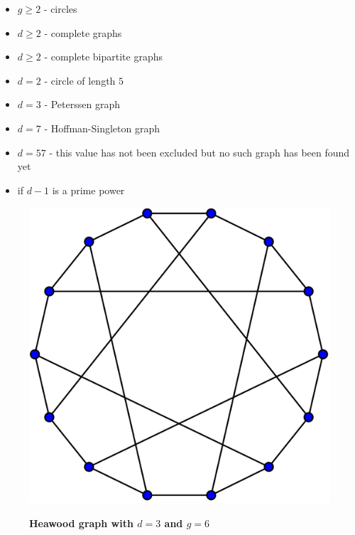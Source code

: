 \documentclass[portrait,a0,final]{a0poster}
\begin{document}
\begin{multicols}{3}
\begin{itemize}
	\item{$g \geq 2$ - circles}
    \item{$d \geq 2$ - complete graphs}
    \item{$d \geq 2$ - complete bipartite graphs}
    \item{$d=2$ - circle of length $5$}
    \item[]{\makebox[5cm]{\hfill}$d=3$ - Peterssen graph}
    \item[]{\makebox[5cm]{\hfill}$d=7$ - Hoffman-Singleton graph}
    \item[]{\makebox[5cm]{\hfill}$d=57$ - this value has not been excluded but no such graph has been found yet }
    \item{if $d-1$ is a prime power}
\end{itemize}
\begin{figure}
	\centering
	\includegraphics[scale=0.4]{Heawood_graph.png} 

	\textbf{Heawood graph with $d=3$ and $g=6$}
\end{figure}
\end{multicols}

\vfill
\begin{center}
\end{center}
\end{document}
